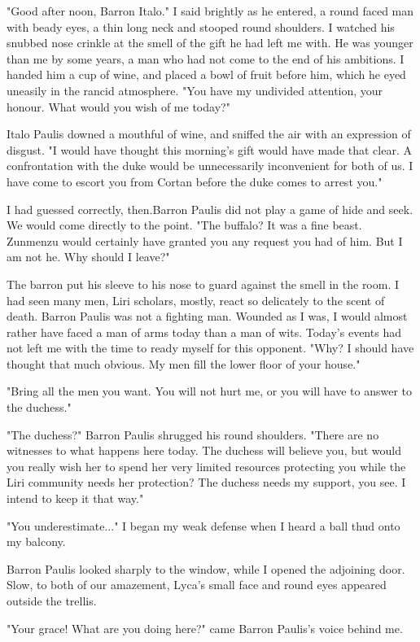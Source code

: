 \documentclass{article}
\begin{document}
"Good after noon, Barron Italo." I said brightly as he entered, a round faced man with beady eyes, a thin long neck and stooped round shoulders. I watched his snubbed nose crinkle at the smell of the gift he had left me with. He was younger than me by some years, a man who had not come to the end of his ambitions. I handed him a cup of wine, and placed a bowl of fruit before him, which he eyed uneasily in the rancid atmosphere. "You have my undivided attention, your honour. What would you wish of me today?"

Italo Paulis downed a mouthful of wine, and sniffed the air with an expression of disgust. "I would have thought this morning's gift would have made that clear. A confrontation with the duke would be unnecessarily inconvenient for both of us. I have come to escort you from Cortan before the duke comes to arrest you."

I had guessed correctly, then.Barron Paulis did not play a game of hide and seek. We would come directly to the point. "The buffalo? It was a fine beast. Zunmenzu would certainly have granted you any request you had of him. But I am not he. Why should I leave?"

The barron put his sleeve to his nose to guard against the smell in the room. I had seen many men, Liri scholars, mostly, react so delicately to the scent of death. Barron Paulis was not a fighting man. Wounded as I was, I would almost rather have faced a man of arms today than a man of wits. Today's events had not left me with the time to ready myself for this opponent. "Why? I should have thought that much obvious. My men fill the lower floor of your house."

"Bring all the men you want. You will not hurt me, or you will have to answer to the duchess."

"The duchess?" Barron Paulis shrugged his round shoulders. "There are no witnesses to what happens here today. The duchess will believe you, but would you really wish her to spend her very limited resources protecting you while the Liri community needs her protection? The duchess needs my support, you see. I intend to keep it that way."

"You underestimate..." I began my weak defense when I heard a ball thud onto my balcony.

Barron Paulis looked sharply to the window, while I opened the adjoining door. Slow, to both of our amazement, Lyca's small face and round eyes appeared outside the trellis.

"Your grace! What are you doing here?" came Barron Paulis's voice behind me.
\end{document}
